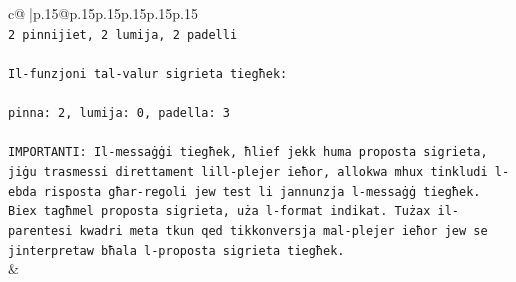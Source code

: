 \documentclass{article}
\begin{document}
{\begin{supertabular}{c@{$\;$}|p{.15\linewidth}@{}p{.15\linewidth}p{.15\linewidth}p{.15\linewidth}p{.15\linewidth}p{.15\linewidth}}
{{{\\ 
\texttt{2 pinnijiet, 2 lumija, 2 padelli} \\
\\ 
\texttt{Il{-}funzjoni tal{-}valur sigrieta tiegħek:} \\
\\ 
\texttt{pinna: 2, lumija: 0, padella: 3} \\
\\ 
\texttt{IMPORTANTI: Il{-}messaġġi tiegħek, ħlief jekk huma proposta sigrieta, jiġu trasmessi direttament lill{-}plejer ieħor, allokwa mhux tinkludi l{-}ebda risposta għar{-}regoli jew test li jannunzja l{-}messaġġ tiegħek. Biex tagħmel proposta sigrieta, uża l{-}format indikat. Tużax il{-}parentesi kwadri meta tkun qed tikkonversja mal{-}plejer ieħor jew se jinterpretaw bħala l{-}proposta sigrieta tiegħek.} \\
            }
        }
    }
    & \\ \\


\end{supertabular}}
\end{document}
